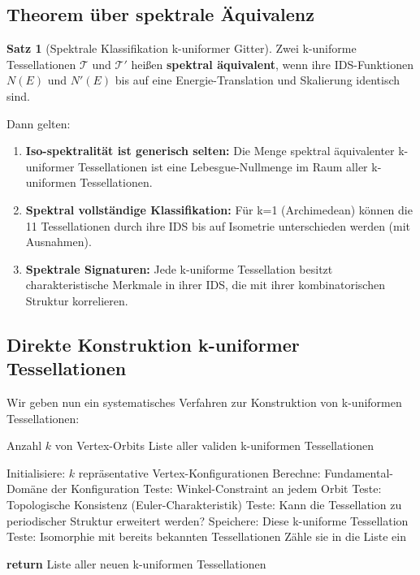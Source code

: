 \documentclass[a4paper,12pt]{article}
\theoremstyle{definition}
\newtheorem{satz}{Satz}[section]
\begin{document}
\subsection{Theorem über spektrale Äquivalenz}

\begin{satz}[Spektrale Klassifikation k-uniformer Gitter]
	Zwei k-uniforme Tessellationen $\mathcal{T}$ und $\mathcal{T}'$ heißen \textbf{spektral äquivalent}, wenn ihre IDS-Funktionen $N(E)$ und $N'(E)$ bis auf eine Energie-Translation und Skalierung identisch sind.
	
	Dann gelten:
	
	\begin{enumerate}
		\item \textbf{Iso-spektralität ist generisch selten:} Die Menge spektral äquivalenter k-uniformer Tessellationen ist eine Lebesgue-Nullmenge im Raum aller k-uniformen Tessellationen.
		
		\item \textbf{Spektral vollständige Klassifikation:} Für k=1 (Archimedean) können die 11 Tessellationen durch ihre IDS bis auf Isometrie unterschieden werden (mit Ausnahmen).
		
		\item \textbf{Spektrale Signaturen:} Jede k-uniforme Tessellation besitzt charakteristische Merkmale in ihrer IDS, die mit ihrer kombinatorischen Struktur korrelieren.
	\end{enumerate}
\end{satz}

\subsection{Direkte Konstruktion k-uniformer Tessellationen}

Wir geben nun ein systematisches Verfahren zur Konstruktion von k-uniformen Tessellationen:

\begin{algorithm}
	\caption{Konstruktion k-uniformer Tessellationen durch Orbit-Erweiterung}
	\begin{algorithmic}[1]
		\Require Anzahl $k$ von Vertex-Orbits
		\Ensure Liste aller validen k-uniformen Tessellationen
		
		\State Initialisiere: $k$ repräsentative Vertex-Konfigurationen
				\State Berechne: Fundamental-Domäne der Konfiguration
				\State Teste: Winkel-Constraint an jedem Orbit
					\State Teste: Topologische Konsistenz (Euler-Charakteristik)
						\State Teste: Kann die Tessellation zu periodischer Struktur erweitert werden?
							\State Speichere: Diese k-uniforme Tessellation
							\State Teste: Isomorphie mit bereits bekannten Tessellationen
								\State Zähle sie in die Liste ein
							\EndIf
						\EndIf
					\EndIf
				\EndIf
			\EndFor
		\EndFor
		
		\State \textbf{return} Liste aller neuen k-uniformen Tessellationen
	\end{algorithmic}
\end{algorithm}
\end{document}

